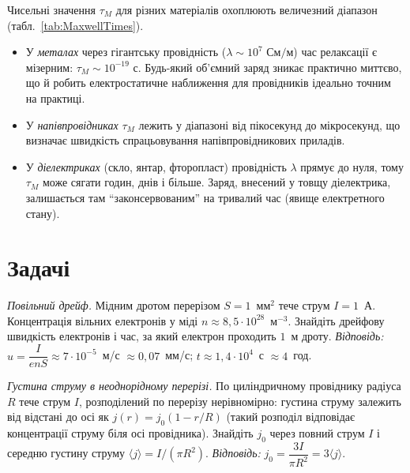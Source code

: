 Чисельні значення $\tau_M$ для різних матеріалів охоплюють величезний діапазон (табл.~\ref{tab:MaxwellTimes}).
\begin{itemize}
    \item У \emph{металах} через гігантську провідність ($\lambda \sim 10^7 \text{ См/м}$) час релаксації є мізерним: $\tau_M \sim 10^{-19}\text{ с}$. Будь-який об'ємний заряд зникає практично миттєво, що й робить електростатичне наближення для провідників ідеально точним на практиці.
    \item У \emph{напівпровідниках} $\tau_M$ лежить у діапазоні від пікосекунд до мікросекунд, що визначає швидкість спрацьовування напівпровідникових приладів.
    \item У \emph{діелектриках} (скло, янтар, фторопласт) провідність $\lambda$ прямує до нуля, тому $\tau_M$ може сягати годин, днів і більше. Заряд, внесений у товщу діелектрика, залишається там \enquote{законсервованим} на тривалий час (явище електретного стану).
\end{itemize}



\section*{Задачі}
{}

\begin{problem}\label{prb:DriftVelocityCopper}
	\emph{Повільний дрейф.} Мідним дротом перерізом $S=1$~мм$^2$ тече струм $I=1$~А. Концентрація вільних електронів у міді
	$n\approx8{,}5\cdot10^{28}$~м$^{-3}$. Знайдіть дрейфову швидкість електронів і час, за який електрон проходить $1$~м дроту.
	\emph{Відповідь:} $u=\dfrac{I}{enS}\approx7\cdot10^{-5}$~м/с $\approx0{,}07$~мм/с; $t\approx1{,}4\cdot10^{4}$~с $\approx4$~год.
\end{problem}

\begin{problem}\label{prb:CurrentDensityVector}
	\emph{Густина струму в неоднорідному перерізі.} По циліндричному провіднику радіуса $R$ тече струм $I$, розподілений по перерізу
	нерівномірно: густина струму залежить від відстані до осі як $j(r)=j_0\left(1-r/R\right)$ (такий розподіл відповідає концентрації струму біля осі провідника). Знайдіть $j_0$ через
	повний струм $I$ і середню густину струму $\langle j\rangle=I/(\pi R^2)$.
	\emph{Відповідь:} $j_0=\dfrac{3I}{\pi R^2}=3\langle j\rangle$.
\end{problem}

